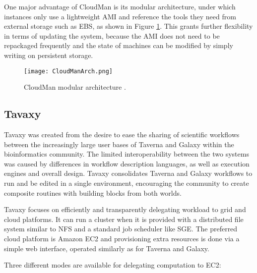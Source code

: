 One major advantage of CloudMan is its modular architecture, under which instances only use a lightweight AMI and reference the tools they need from external storage such as EBS, as shown in Figure \ref{CloudManArch}. This grants further flexibility in terms of updating the system, because the AMI does not need to be repackaged frequently and the state of machines can be modified by simply writing on persistent storage.

\vspace{5mm}
\begin{figure}[H]
	\centering
		\texttt{[image: CloudManArch.png]}
	\caption{CloudMan modular architecture \cite{Afgan2010}.}
	\label{CloudManArch}
\end{figure}

\subsection{Tavaxy}

Tavaxy \cite{Abouelhoda2012} was created from the desire to ease the sharing of scientific workflows between the increasingly large user bases of Taverna and Galaxy within the bioinformatics community. The limited interoperability between the two systems was caused by differences in workflow description languages, as well as execution engines and overall design. Tavaxy consolidates Taverna and Galaxy workflows to run and be edited in a single environment, encouraging the community to create composite routines with building blocks from both worlds.

Tavaxy focuses on efficiently and transparently delegating workload to grid and cloud platforms. It can run a cluster when it is provided with a distributed file system similar to NFS and a standard job scheduler like SGE. The preferred cloud platform is Amazon EC2 and provisioning extra resources is done via a simple web interface, operated similarly as for Taverna and Galaxy.

Three different modes are available for delegating computation to EC2:

